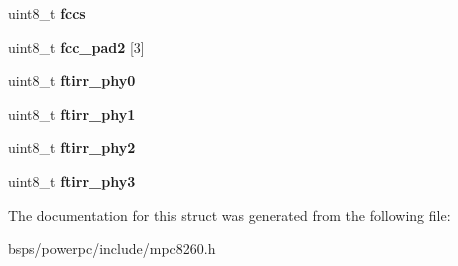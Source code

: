 \begin{DoxyCompactItemize}
uint8\+\_\+t {\bfseries fccs}
\item 
\mbox{\label{structm8260FCCRegisters___af67747ffee603738b66fd75e6650fa0c}} 
uint8\+\_\+t {\bfseries fcc\+\_\+pad2} \mbox{[}3\mbox{]}
\item 
\mbox{\label{structm8260FCCRegisters___a247622a37d3ca98d7ec9e2b479a8891c}} 
uint8\+\_\+t {\bfseries ftirr\+\_\+phy0}
\item 
\mbox{\label{structm8260FCCRegisters___a1f4d24056e943c6f5eebc4c41a285a2d}} 
uint8\+\_\+t {\bfseries ftirr\+\_\+phy1}
\item 
\mbox{\label{structm8260FCCRegisters___a105538be233677ff57f9086ef23a50dd}} 
uint8\+\_\+t {\bfseries ftirr\+\_\+phy2}
\item 
\mbox{\label{structm8260FCCRegisters___a195c7b8696bd7ecbfb3ed19b0321476c}} 
uint8\+\_\+t {\bfseries ftirr\+\_\+phy3}
\end{DoxyCompactItemize}


The documentation for this struct was generated from the following file\+:\begin{DoxyCompactItemize}
\item 
bsps/powerpc/include/mpc8260.\+h\end{DoxyCompactItemize}
